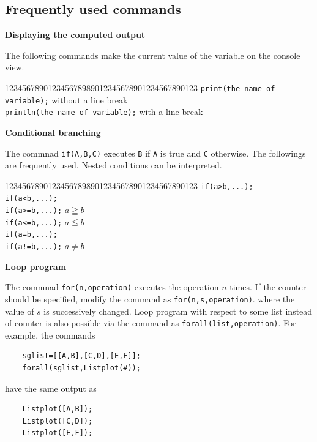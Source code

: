 \documentclass[papersize,a4paper,12pt]{article}
\begin{document}
\subsection{Frequently used commands}

\noindent
{\bf Displaying the computed output}

\noindent 
The following commands 
make the current value of the variable 
on the console view. 

\begin{tabbing}
12345\=6789012345678989012345678901234567890\=123\=\kill
\>\verb|print(the name of variable);| \> without a line break\\
\>\verb|println(the name of variable);| \> with a line break\\  
\end{tabbing}

\noindent
{\bf Conditional branching}

\noindent
The commnad \verb|if(A,B,C)| executes \verb|B| if \verb|A| is true 
and \verb|C| otherwise. 
The followings are frequently used. 
Nested conditions can be interpreted. 

\begin{tabbing}
12345\=67890123456789890\=12345678901234567890123\=\kill
\>\verb|if(a>b,...);|\\
\>\verb|if(a<b,...);|\\
\>\verb|if(a>=b,...);| \> $a\geqq b$\\
\>\verb|if(a<=b,...);| \> $a\leqq b$\\  
\>\verb|if(a=b,...);|\\
\>\verb|if(a!=b,...);| \> $a\neq b$\\  
\end{tabbing}

\noindent
{\bf Loop program}

\noindent
The commnad \verb|for(n,operation)| executes the operation 
$n$ times. If the counter should be specified, 
modify the command as \verb|for(n,s,operation)|. 
where the value of $s$ is successively changed. 
Loop program with respect to some list instead of counter 
is also possible via the command as \verb|forall(list,operation)|. 
For example, the commands

\begin{verbatim}
    sglist=[[A,B],[C,D],[E,F]];
    forall(sglist,Listplot(#));
\end{verbatim}
have the same output as 
\begin{verbatim}
    Listplot([A,B]);
    Listplot([C,D]);
    Listplot([E,F]);
\end{verbatim}
\end{document}
